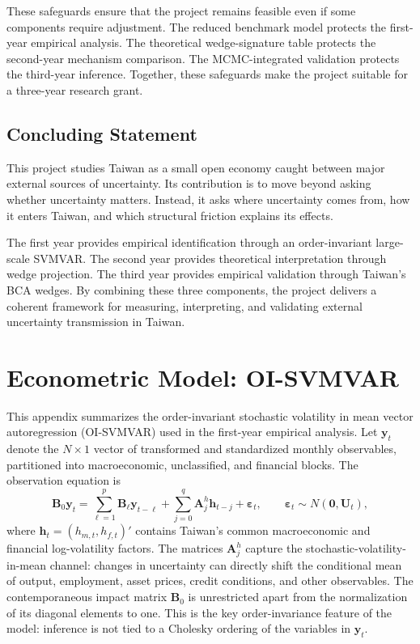 \documentclass[12pt]{article}
\begin{document}
These safeguards ensure that the project remains feasible even if some components require
adjustment. The reduced benchmark model protects the first-year empirical analysis. The
theoretical wedge-signature table protects the second-year mechanism comparison. The
MCMC-integrated validation protects the third-year inference. Together, these safeguards make
the project suitable for a three-year research grant.

\subsection{Concluding Statement}

This project studies Taiwan as a small open economy caught between major external sources of
uncertainty. Its contribution is to move beyond asking whether uncertainty matters. Instead, it
asks where uncertainty comes from, how it enters Taiwan, and which structural friction explains
its effects.

The first year provides empirical identification through an order-invariant large-scale
SVMVAR. The second year provides theoretical interpretation through wedge projection. The
third year provides empirical validation through Taiwan's BCA wedges. By combining these three
components, the project delivers a coherent framework for measuring, interpreting, and validating
external uncertainty transmission in Taiwan.

\appendix
\section{Econometric Model: OI-SVMVAR}
\label{app:oi-svmvar}

This appendix summarizes the order-invariant stochastic volatility in mean vector autoregression
(OI-SVMVAR) used in the first-year empirical analysis. Let $\mathbf{y}_t$ denote the $N \times 1$
vector of transformed and standardized monthly observables, partitioned into macroeconomic,
unclassified, and financial blocks. The observation equation is
\begin{equation}
\mathbf{B}_0 \mathbf{y}_t
= \sum_{\ell=1}^{p} \mathbf{B}_{\ell}\mathbf{y}_{t-\ell}
+ \sum_{j=0}^{q} \mathbf{A}^{h}_{j}\mathbf{h}_{t-j}
+ \boldsymbol{\varepsilon}_t,\qquad
\boldsymbol{\varepsilon}_t \sim N(\mathbf{0},\mathbf{U}_t),
\label{app:obs}
\end{equation}
where $\mathbf{h}_t=(h_{m,t},h_{f,t})'$ contains Taiwan's common macroeconomic and
financial log-volatility factors. The matrices $\mathbf{A}^{h}_{j}$ capture the stochastic-volatility-
in-mean channel: changes in uncertainty can directly shift the conditional mean of output,
employment, asset prices, credit conditions, and other observables. The contemporaneous impact
matrix $\mathbf{B}_0$ is unrestricted apart from the normalization of its diagonal elements to one.
This is the key order-invariance feature of the model: inference is not tied to a Cholesky ordering
of the variables in $\mathbf{y}_t$.
\end{document}
